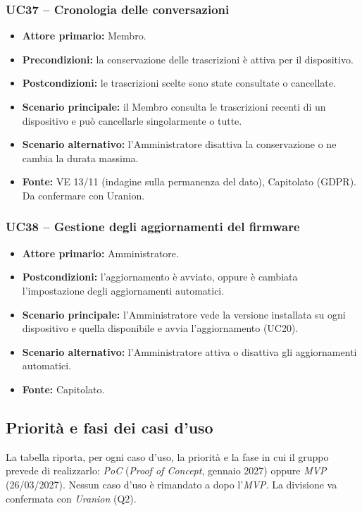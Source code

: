 \documentclass[12pt,a4paper]{article}
\newcommand{\tightlist}{\setlength{\itemsep}{1pt}\setlength{\parskip}{0pt}}
\begin{document}
\subsubsection{UC37 -- Cronologia delle conversazioni}
\begin{itemize}
\tightlist
\item \textbf{Attore primario:} Membro.
\item \textbf{Precondizioni:} la conservazione delle trascrizioni è attiva per il dispositivo.
\item \textbf{Postcondizioni:} le trascrizioni scelte sono state consultate o cancellate.
\item \textbf{Scenario principale:} il Membro consulta le trascrizioni recenti di un dispositivo e può cancellarle singolarmente o tutte.
\item \textbf{Scenario alternativo:} l'Amministratore disattiva la conservazione o ne cambia la durata massima.
\item \textbf{Fonte:} VE 13/11 (indagine sulla permanenza del dato), Capitolato (GDPR). Da confermare con Uranion.
\end{itemize}

\subsubsection{UC38 -- Gestione degli aggiornamenti del firmware}
\begin{itemize}
\tightlist
\item \textbf{Attore primario:} Amministratore.
\item \textbf{Postcondizioni:} l'aggiornamento è avviato, oppure è cambiata l'impostazione degli aggiornamenti automatici.
\item \textbf{Scenario principale:} l'Amministratore vede la versione installata su ogni dispositivo e quella disponibile e avvia l'aggiornamento (UC20).
\item \textbf{Scenario alternativo:} l'Amministratore attiva o disattiva gli aggiornamenti automatici.
\item \textbf{Fonte:} Capitolato.
\end{itemize}

\subsection{Priorità e fasi dei casi d'uso}\label{sec:fasi}

La tabella riporta, per ogni caso d'uso, la priorità e la fase in cui il gruppo prevede di realizzarlo: \emph{PoC} (\emph{Proof of Concept}, gennaio 2027) oppure \emph{MVP} (26/03/2027). Nessun caso d'uso è rimandato a dopo l'\emph{MVP}. La divisione va confermata con \emph{Uranion} (Q2).
\end{document}
